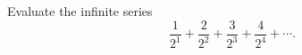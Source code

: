 Evaluate the infinite series
\[
\dfrac{1}{2^1}+\dfrac{2}{2^2}+\dfrac{3}{2^3}+\dfrac{4}{2^4}+\cdots .
\]
